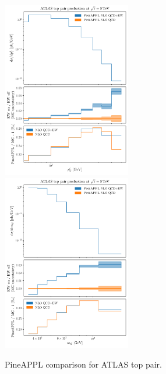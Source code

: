 \begin{figure}
    \centering
    \includegraphics[width=0.5\textwidth]{figures/pineappl_ATLAS_TTB_DIFF_8TEV_LJ_TPT}%
    \includegraphics[width=0.5\textwidth]{figures/pineappl_ATLAS_TTB_DIFF_8TEV_LJ_TTM}
    \caption{PineAPPL comparison for ATLAS top pair.}
    \label{fig:cmsdy2d11_bins56}
\end{figure}

